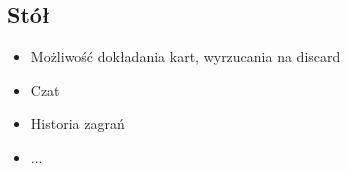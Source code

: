 \documentclass{article}
\begin{document}
\subsection{Stół}
\begin{itemize}
	\item Możliwość dokładania kart, wyrzucania na discard
	\item Czat
	\item Historia zagrań
	\item ...
\end{itemize}
\end{document}
